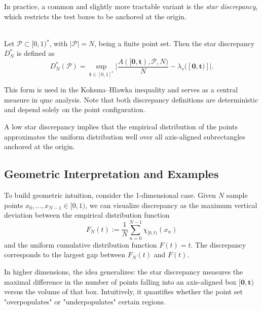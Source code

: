 In practice, a common and slightly more tractable variant is the \emph{star
discrepancy}, which restricts the test boxes to be anchored at the origin.

\begin{definition} \ \\
Let $\mathcal{P}\subset [0,1)^s$, with $|\mathcal{P}| = N$, being a finite point
set. Then the star discrepancy $D_N^*$ is defined as
\begin{equation*}
    D_N^*(\mathcal{P}) = \sup\limits_{\boldsymbol{t} \in [0,1]^s} \bigg| \frac{A([\boldsymbol{0},\boldsymbol{t}), \mathcal{P}, N)}{N} - \lambda_s([\boldsymbol{0},\boldsymbol{t})] \bigg|.
\end{equation*}
\end{definition}

This form is used in the Koksma--Hlawka inequality and serves as a central
measure in \ac{qmc} analysis. Note that both discrepancy definitions are
deterministic and depend solely on the point configuration.

\begin{remark}
A low star discrepancy implies that the empirical distribution of the points
approximates the uniform distribution well over all axis-aligned subrectangles
anchored at the origin.
\end{remark}

\subsection{Geometric Interpretation and Examples}

To build geometric intuition, consider the 1-dimensional case. Given $N$ sample
points $x_0, \dots, x_{N-1} \in [0,1)$, we can visualize discrepancy as the
maximum vertical deviation between the empirical distribution function
\begin{equation*}
F_N(t) := \frac{1}{N} \sum_{n=0}^{N-1} \chi_{[0,t)}(x_n)
\end{equation*}
and the uniform cumulative distribution function $F(t) = t$. The discrepancy
corresponds to the largest gap between $F_N(t)$ and $F(t)$.

In higher dimensions, the idea generalizes: the star discrepancy measures the
maximal difference in the number of points falling into an axis-aligned box
$[\boldsymbol{0}, \boldsymbol{t})$ versus the volume of that box. Intuitively,
it quantifies whether the point set "overpopulates" or "underpopulates" certain
regions.

